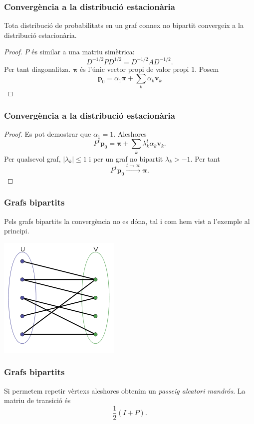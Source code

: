 \documentclass[aspectratio=169, 12pt]{beamer}
\renewcommand{\vec}[1]{\mathbf{\bm #1}}
\newcommand{\abs}[1]{\left\lvert #1 \right\rvert}
\begin{document}
\begin{frame}
	\frametitle{Convergència a la distribució estacionària}
	\begin{theorem}
		Tota distribució de probabilitats en un graf connex no bipartit convergeix a la distribució estacionària. 
	\end{theorem}
	\pause
	\begin{proof}
\( P \) és similar a una matriu simètrica:
\[ D^{-1/2}PD^{1/2} = D^{-1/2}AD^{-1/2}. \] \pause
Per tant diagonalitza. \pause
\( \vec{\pi} \) és l'únic vector propi de valor propi 1. Posem \[ \vec{p}_0 = \alpha_1 \vec{\pi} + \sum_k \alpha_k \vec{v}_k \]
\end{proof}
\end{frame}

\begin{frame}
	\frametitle{Convergència a la distribució estacionària}
	\begin{proof}
		Es pot demostrar que \( \alpha_1 = 1 \). \pause Aleshores
		\begin{equation*}
			P^t \vec{p}_0 = \vec{\pi} + \sum_k \lambda_k^t \alpha_k \vec{v}_k. 
		\end{equation*} \pause
		Per qualsevol graf, \( \abs{\lambda_k} \leq 1 \) i per un graf no bipartit \( \lambda_k > -1 \). \pause Per tant 
		\begin{equation*}
			P^t \vec{p}_0 \xrightarrow{t \to \infty} \vec{\pi}.
		\end{equation*}
	\end{proof}
\end{frame}

\begin{frame}
\frametitle{Grafs bipartits}
Pels grafs bipartits la convergència no es dóna, tal i com hem vist a l'exemple al principi. \pause

\centering
\includegraphics[scale = 0.7]{bipartit.png}
\end{frame}

\begin{frame}
\frametitle{Grafs bipartits}
Si permetem repetir vèrtexs aleshores obtenim un \emph{passeig aleatori mandrós}. \pause La matriu de transició és \[ \frac{1}{2}(I + P). \]
\end{frame}
\end{document}
